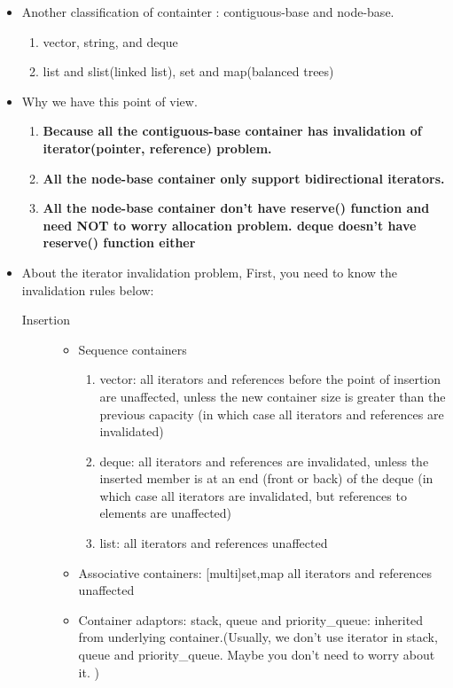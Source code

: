 \documentclass[a4paper,11pt,twoside]{book}
\begin{document}
\begin{itemize}
\item Another classification of containter : contiguous-base and node-base.
\begin{enumerate}
\item vector, string, and deque
\item list and slist(linked list), set and map(balanced trees)
\end{enumerate}

\item Why we have this point of view.
\begin{enumerate}
\item \textbf{Because all the contiguous-base container has invalidation of iterator(pointer, reference) problem. }
\item \textbf{All the node-base container only support bidirectional iterators. }
\item \textbf{All the node-base container don't have reserve() function and need NOT to worry allocation problem. deque doesn't have reserve() function either }
\end{enumerate}

\item About the iterator invalidation problem,  First, you need to know the invalidation rules below:
\begin{description}
\item[Insertion]
\begin{itemize}
\item Sequence containers
		\begin{enumerate}
		\item vector: all iterators and references before the point of insertion are unaffected, unless the new container size is greater than the previous capacity (in which case all iterators and references are invalidated)
		\item deque: all iterators and references are invalidated, unless the inserted member is at an end (front or back) of the deque (in which case all iterators are invalidated, but references to elements are unaffected)
		\item list: all iterators and references unaffected
		\end{enumerate}

\item Associative containers: [multi]{set,map} all iterators and references unaffected

\item Container adaptors:  stack, queue and priority\_queue: inherited from underlying container.(Usually, we don't use iterator in stack, queue and priority\_queue. Maybe you don't need to worry about it. )
\end{itemize}


\end{description}
\end{itemize}
\end{document}
